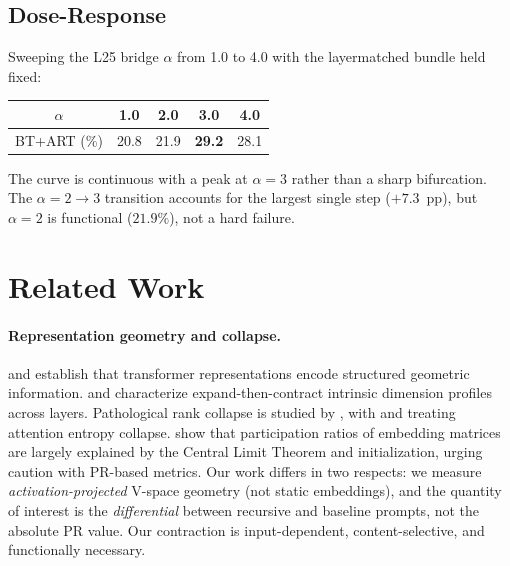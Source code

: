 \documentclass{article}
\begin{document}
\subsection{Dose-Response}

Sweeping the L25 bridge $\alpha$ from 1.0 to 4.0 with the layermatched bundle held fixed:

\begin{center}
\small
\begin{tabular}{ccccc}
\toprule
$\alpha$ & 1.0 & 2.0 & 3.0 & 4.0 \\
\midrule
BT+ART (\%) & 20.8 & 21.9 & \textbf{29.2} & 28.1 \\
\bottomrule
\end{tabular}
\end{center}

The curve is continuous with a peak at $\alpha{=}3$ rather than a sharp bifurcation.
The $\alpha{=}2 \to 3$ transition accounts for the largest single step ($+7.3$~pp),
but $\alpha{=}2$ is functional ($21.9\%$), not a hard failure.






\section{Related Work}
\label{sec:related}

\paragraph{Representation geometry and collapse.}
\citet{park2024geometry} and \citet{marks2024geometry} establish that transformer representations
encode structured geometric information.
\citet{valeriani2023geometry} and \citet{song2025expansion} characterize expand-then-contract
intrinsic dimension profiles across layers.
Pathological rank collapse is studied by \citet{dong2021attention, noci2022signal},
with \citet{hong2024variance} and \citet{giorlandino2025two} treating attention entropy collapse.
\citet{lee2025shared} show that participation ratios of embedding matrices are largely
explained by the Central Limit Theorem and initialization, urging caution with PR-based metrics.
Our work differs in two respects: we measure \emph{activation-projected} V-space geometry
(not static embeddings), and the quantity of interest is the \emph{differential} between
recursive and baseline prompts, not the absolute PR value.
Our contraction is input-dependent, content-selective, and functionally necessary.
\end{document}
